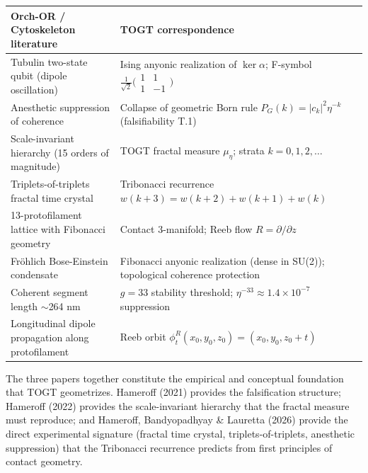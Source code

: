 \documentclass[11pt,a4paper]{article}
\theoremstyle{definition}
\theoremstyle{remark}
\begin{document}
\begin{center}
\begin{tabular}{p{5.5cm}p{5.5cm}}
\toprule
\textbf{Orch-OR / Cytoskeleton literature} & \textbf{TOGT correspondence} \\
\midrule
Tubulin two-state qubit (dipole oscillation) & Ising anyonic realization of $\ker\alpha$; F-symbol $\tfrac{1}{\sqrt{2}}\bigl(\begin{smallmatrix}1&1\\1&-1\end{smallmatrix}\bigr)$ \\[6pt]
Anesthetic suppression of coherence & Collapse of geometric Born rule $P_G(k)=|c_k|^2\eta^{-k}$ (falsifiability T.1) \\[6pt]
Scale-invariant hierarchy (15 orders of magnitude) & TOGT fractal measure $\mu_\eta$; strata $k=0,1,2,\ldots$ \\[6pt]
Triplets-of-triplets fractal time crystal & Tribonacci recurrence $w(k+3)=w(k+2)+w(k+1)+w(k)$ \\[6pt]
13-protofilament lattice with Fibonacci geometry & Contact 3-manifold; Reeb flow $R=\partial/\partial z$ \\[6pt]
Fr\"{o}hlich Bose-Einstein condensate & Fibonacci anyonic realization (dense in SU(2)); topological coherence protection \\[6pt]
Coherent segment length $\sim$264 nm & $g=33$ stability threshold; $\eta^{-33}\approx1.4\times10^{-7}$ suppression \\[6pt]
Longitudinal dipole propagation along protofilament & Reeb orbit $\phi_t^R(x_0,y_0,z_0)=(x_0,y_0,z_0+t)$ \\
\bottomrule
\end{tabular}
\end{center}

The three papers together constitute the empirical and conceptual foundation that TOGT
geometrizes. Hameroff (2021) provides the falsification structure; Hameroff (2022) provides
the scale-invariant hierarchy that the fractal measure must reproduce; and Hameroff,
Bandyopadhyay \& Lauretta (2026) provide the direct experimental signature (fractal time
crystal, triplets-of-triplets, anesthetic suppression) that the Tribonacci recurrence
predicts from first principles of contact geometry.
\end{document}

